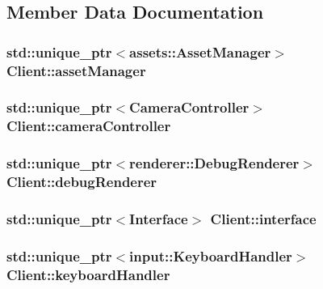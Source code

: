 \subsection{Member Data Documentation}
\hypertarget{classClient_ae9bbbe2ace139bf7a3d0ff5358e4c222}{
\subsubsection[{asset\-Manager}]{\setlength{\rightskip}{0pt plus 5cm}std\-::unique\-\_\-ptr$<${\bf assets\-::\-Asset\-Manager}$>$ Client\-::asset\-Manager}}\label{classClient_ae9bbbe2ace139bf7a3d0ff5358e4c222}
\hypertarget{classClient_a31467035f96d4630d6787a500f2dce71}{
\subsubsection[{camera\-Controller}]{\setlength{\rightskip}{0pt plus 5cm}std\-::unique\-\_\-ptr$<${\bf Camera\-Controller}$>$ Client\-::camera\-Controller}}\label{classClient_a31467035f96d4630d6787a500f2dce71}
\hypertarget{classClient_ab189badcd85ba72158b28028888569d4}{
\subsubsection[{debug\-Renderer}]{\setlength{\rightskip}{0pt plus 5cm}std\-::unique\-\_\-ptr$<${\bf renderer\-::\-Debug\-Renderer}$>$ Client\-::debug\-Renderer}}\label{classClient_ab189badcd85ba72158b28028888569d4}
\hypertarget{classClient_af26242132ec324e1d85fec7e1d1e97d3}{
\subsubsection[{interface}]{\setlength{\rightskip}{0pt plus 5cm}std\-::unique\-\_\-ptr$<${\bf Interface}$>$ Client\-::interface}}\label{classClient_af26242132ec324e1d85fec7e1d1e97d3}
\hypertarget{classClient_ab3555d9bf11fd111bde33977cba15564}{
\subsubsection[{keyboard\-Handler}]{\setlength{\rightskip}{0pt plus 5cm}std\-::unique\-\_\-ptr$<${\bf input\-::\-Keyboard\-Handler}$>$ Client\-::keyboard\-Handler}}\label{classClient_ab3555d9bf11fd111bde33977cba15564}
